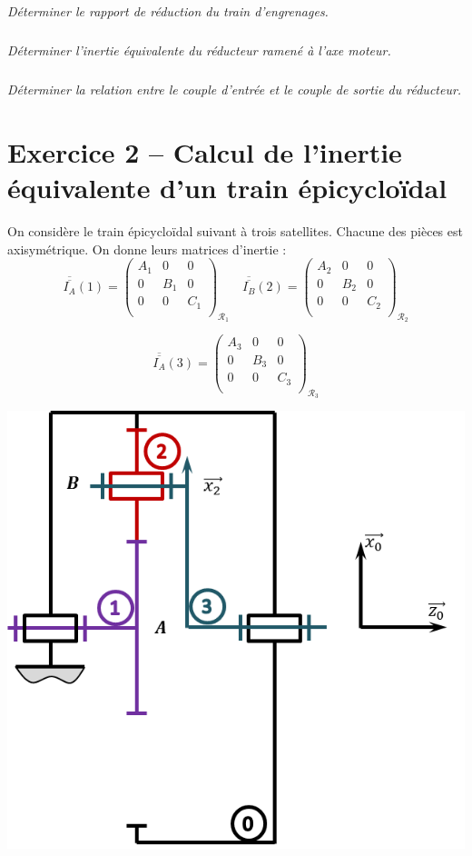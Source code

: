 \documentclass[10pt,fleqn]{article} %
\begin{document}
\begin{multicols}{2}
\subparagraph{}
\textit{Déterminer le rapport de réduction du train d'engrenages.}

\subparagraph{}
\textit{Déterminer l'inertie équivalente du réducteur ramené à l'axe moteur.}

\subparagraph{}
\textit{Déterminer la relation entre le couple d'entrée et le couple de sortie du réducteur.}

\section*{Exercice 2 -- Calcul de l'inertie équivalente d'un train épicycloïdal}
\setcounter{exo}{0}

On considère le train épicycloïdal suivant à trois satellites. Chacune des pièces est axisymétrique. On donne leurs matrices d'inertie :
$$
\overline{\overline{I_A}}(1) = 
\begin{pmatrix} 
A_1 & 0 & 0 \\
0 & B_1 & 0 \\
0 & 0 & C_1 \\
\end{pmatrix}_{\mathcal{R}_1}
\quad
\overline{\overline{I_B}}(2) = 
\begin{pmatrix} 
A_2 & 0 & 0 \\
0 & B_2 & 0 \\
0 & 0 & C_2 \\
\end{pmatrix}_{\mathcal{R}_2}
$$

$$
\overline{\overline{I_A}}(3) = 
\begin{pmatrix} 
A_3 & 0 & 0 \\
0 & B_3 & 0 \\
0 & 0 & C_3 \\
\end{pmatrix}_{\mathcal{R}_3}
$$

\begin{center}
\includegraphics[width=.45\textwidth]{images/train_01}
\end{center}


\end{multicols}
\end{document}

